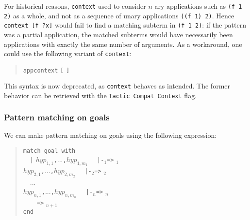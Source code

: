 \begin{Variants}
\item {}
For historical reasons, {\tt context} used to consider $n$-ary applications
such as {\tt (f 1 2)} as a whole, and not as a sequence of unary
applications {\tt ((f 1) 2)}. Hence {\tt context [f ?x]} would fail
to find a matching subterm in {\tt (f 1 2)}: if the pattern was a partial
application, the matched subterms would have necessarily been
applications with exactly the same number of arguments.
As a workaround, one could use the following variant of {\tt context}:
\begin{quote}
{\tt appcontext} {\ident} {\tt [} {\cpattern} {\tt ]}
\end{quote}
This syntax is now deprecated, as {\tt context} behaves as intended. The former
behavior can be retrieved with the {\tt Tactic Compat Context} flag.

\end{Variants}

\subsubsection[Pattern matching on goals]{Pattern matching on goals
}

We can make pattern matching on goals using the following expression:
\begin{quote}
\begin{tabbing}
{\tt match goal with}\\
~~\={\tt |} $hyp_{1,1}${\tt ,}...{\tt ,}$hyp_{1,m_1}$
   ~~{\tt |-}{\cpattern}$_1${\tt =>} {\tacexpr}$_1$\\
  \>{\tt |} $hyp_{2,1}${\tt ,}...{\tt ,}$hyp_{2,m_2}$
   ~~{\tt |-}{\cpattern}$_2${\tt =>} {\tacexpr}$_2$\\
~~...\\
  \>{\tt |} $hyp_{n,1}${\tt ,}...{\tt ,}$hyp_{n,m_n}$
   ~~{\tt |-}{\cpattern}$_n${\tt =>} {\tacexpr}$_n$\\
  \>{\tt |\_}~~~~{\tt =>} {\tacexpr}$_{n+1}$\\
{\tt end}
\end{tabbing}
\end{quote}


